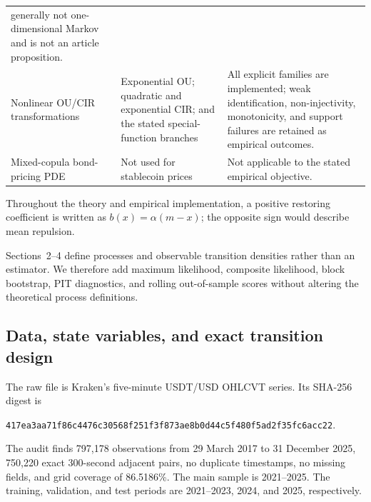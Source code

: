 \documentclass[11pt]{article}
\newcommand{\1}{\mathbf{1}}
\begin{document}
\begin{table}[htbp]
\begin{threeparttable}
\begin{tabular}{p{}p{}p{}}
generally not one-dimensional Markov and is not an article proposition. \\
Nonlinear OU/CIR transformations & Exponential OU; quadratic and exponential
CIR; and the stated special-function branches & All explicit families are
implemented; weak identification, non-injectivity, monotonicity, and support
failures are retained as empirical outcomes. \\
Mixed-copula bond-pricing PDE & Not used for stablecoin prices & Not applicable
to the stated empirical objective. \\
\bottomrule
\end{tabular}
\begin{tablenotes}[flushleft]\footnotesize
\item Throughout the theory and empirical implementation, a positive restoring
coefficient is written as $b(x)=\alpha(m-x)$; the opposite sign would describe
mean repulsion.
\end{tablenotes}
\end{threeparttable}
\end{table}

Sections~2--4 define processes and observable transition densities rather than
an estimator.  We therefore add maximum likelihood, composite likelihood, block
bootstrap, PIT diagnostics, and rolling out-of-sample scores without altering
the theoretical process definitions.

\subsection{Data, state variables, and exact transition design}
\label{emp:sec:data}

The raw file is Kraken's five-minute USDT/USD OHLCVT series.  Its SHA-256 digest
is
\begin{center}
\texttt{417ea3aa71f86c4476c30568f251f3f873ae8b0d44c5f480f5ad2f35fc6acc22}.
\end{center}
The audit finds 797,178 observations from 29 March 2017 to 31 December 2025,
750,220 exact 300-second adjacent pairs, no duplicate timestamps, no missing
fields, and grid coverage of 86.5186\%.  The main sample is 2021--2025.  The
training, validation, and test periods are 2021--2023, 2024, and 2025,
respectively.
\end{document}
